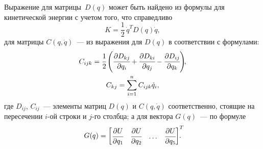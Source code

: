 Выражение для матрицы~$D(q)$ может быть найдено из формулы для кинетической энергии с учетом того, что справедливо
\begin{equation}\label{eq_K_in_form_with_D}
    K = \frac{1}{2} \, \dot{q}^T D(q) \dot{q},
\end{equation}
для матрицы $C(q,\dot{q})$~--- из выражения для $D(q)$ в соответствии с формулами:
\begin{gather}
    C_{ijk} = \cfrac{1}{2} \left( \cfrac{\partial D_{kj}}{\partial q_i} + \cfrac{\partial D_{ki}}{\partial q_j} - \cfrac{\partial D_{ij}}{\partial q_k}\right)\!\!,
    \\
    C_{kj} = \sum_{i = 1}^n C_{ijk} \dot{q}_i,
\end{gather}
где $D_{ij}$, $C_{ij}$~--- элементы матриц $D(q)$ и $C(q,\dot{q})$ соответственно, стоящие на пересечении $i$-ой строки и $j$-го столбца;
а для вектора $G(q)$~--- по формуле
\begin{equation}
    G(q) =
    \begin{bmatrix}
        \cfrac{\partial U}{\partial q_1} &
        \cfrac{\partial U}{\partial q_2} &
        \dots &
        \cfrac{\partial U}{\partial q_5}
    \end{bmatrix}^T\!\!\!\!\!\ldotp
\end{equation}

